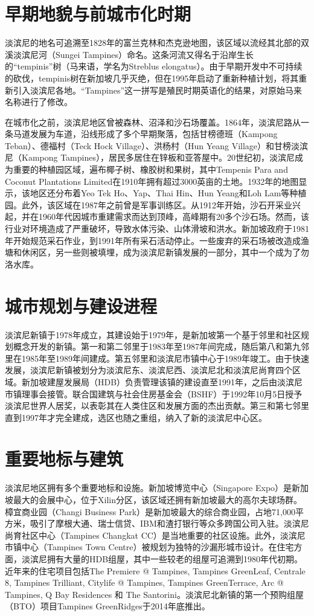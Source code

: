 \documentclass[11pt,a4paper,twoside,openany]{book}
\begin{document}
\section{早期地貌与前城市化时期}
淡滨尼的地名可追溯至1828年的富兰克林和杰克逊地图，该区域以流经其北部的双溪淡滨尼河（Sungei Tampines）命名。这条河流又得名于沿岸生长的“tempinis”树（马来语，学名为Streblus elongatus）。由于早期开发中不可持续的砍伐，tempinis树在新加坡几乎灭绝，但在1995年启动了重新种植计划，将其重新引入淡滨尼各地。“Tampines”这一拼写是殖民时期英语化的结果，对原始马来名称进行了修改。

在城市化之前，淡滨尼地区曾被森林、沼泽和沙石场覆盖。1864年，淡滨尼路从一条马道发展为车道，沿线形成了多个早期聚落，包括甘榜德班（Kampong Teban）、德福村（Teck Hock Village）、洪杨村（Hun Yeang Village）和甘榜淡滨尼（Kampong Tampines），居民多居住在锌板和亚答屋中。20世纪初，淡滨尼成为重要的种植园区域，遍布椰子树、橡胶树和果树，其中Tempenis Para and Coconut Plantations Limited在1910年拥有超过3000英亩的土地。1932年的地图显示，该地区还分布着Yeo Tek Ho、Yap、Thai Hin、Hun Yeang和Loh Lam等种植园。此外，该区域在1987年之前曾是军事训练区。从1912年开始，沙石开采业兴起，并在1960年代因城市重建需求而达到顶峰，高峰期有20多个沙石场。然而，该行业对环境造成了严重破坏，导致水体污染、山体滑坡和洪水。新加坡政府于1981年开始规范采石作业，到1991年所有采石活动停止。一些废弃的采石场被改造成渔塘和休闲区，另一些则被填埋，成为淡滨尼新镇发展的一部分，其中一个成为了勿洛水库。

\section{城市规划与建设进程}
淡滨尼新镇于1978年成立，其建设始于1979年，是新加坡第一个基于邻里和社区规划概念开发的新镇。第一和第二邻里于1983年至1987年间完成，随后第八和第九邻里在1985年至1989年间建成。第五邻里和淡滨尼市镇中心于1989年竣工。由于快速发展，淡滨尼新镇被划分为淡滨尼东、淡滨尼西、淡滨尼北和淡滨尼尚育四个区域。新加坡建屋发展局（HDB）负责管理该镇的建设直至1991年，之后由淡滨尼市镇理事会接管。联合国建筑与社会住房基金会（BSHF）于1992年10月5日授予淡滨尼世界人居奖，以表彰其在人类住区和发展方面的杰出贡献。第三和第七邻里直到1997年才完全建成，选区也随之重组，纳入了新的淡滨尼中心区。

\section{重要地标与建筑}
淡滨尼地区拥有多个重要地标和设施。新加坡博览中心（Singapore Expo）是新加坡最大的会展中心，位于Xilin分区，该区域还拥有新加坡最大的高尔夫球场群。樟宜商业园（Changi Business Park）是新加坡最大的综合商业园，占地71,000平方米，吸引了摩根大通、瑞士信贷、IBM和渣打银行等众多跨国公司入驻。淡滨尼尚育社区中心（Tampines Changkat CC）是当地重要的社区设施。此外，淡滨尼市镇中心（Tampines Town Centre）被规划为独特的沙漏形城市设计。在住宅方面，淡滨尼拥有大量的HDB组屋，其中一些较老的组屋可追溯到1980年代初期。近年来的住宅项目包括The Premiere @ Tampines, Tampines GreenLeaf, Centrale 8, Tampines Trilliant, Citylife @ Tampines, Tampines GreenTerrace, Arc @ Tampines, Q Bay Residences 和 The Santorini。淡滨尼北新镇的第一个预购组屋（BTO）项目Tampines GreenRidges于2014年底推出。
\end{document}
